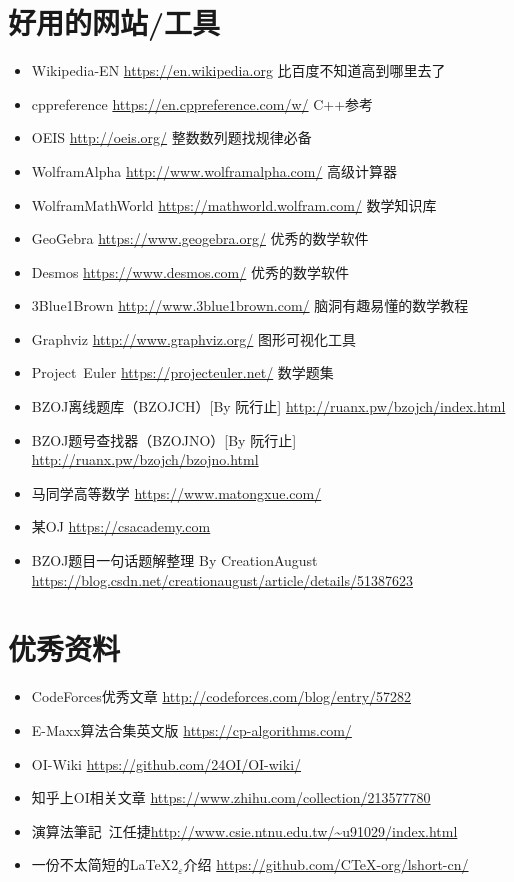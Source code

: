 \section{好用的网站/工具}
\begin{itemize}
    \item Wikipedia-EN \url{https://en.wikipedia.org} 比百度不知道高到哪里去了
    \item cppreference \url{https://en.cppreference.com/w/} C++参考
    \item OEIS \url{http://oeis.org/} 整数数列题找规律必备
    \item WolframAlpha \url{http://www.wolframalpha.com/} 高级计算器
    \item WolframMathWorld \url{https://mathworld.wolfram.com/} 数学知识库
    \item GeoGebra \url{https://www.geogebra.org/} 优秀的数学软件
    \item Desmos \url{https://www.desmos.com/} 优秀的数学软件
    \item 3Blue1Brown \url{http://www.3blue1brown.com/} 脑洞有趣易懂的数学教程
    \item Graphviz \url{http://www.graphviz.org/} 图形可视化工具
    \item Project~Euler \url{https://projecteuler.net/} 数学题集
    \item BZOJ离线题库（BZOJCH）[By 阮行止] \url{http://ruanx.pw/bzojch/index.html}
    \item BZOJ题号查找器（BZOJNO）[By 阮行止]
    \url{http://ruanx.pw/bzojch/bzojno.html}
    \item 马同学高等数学 \url{https://www.matongxue.com/}
    \item 某OJ \url{https://csacademy.com}
    \item BZOJ题目一句话题解整理 By CreationAugust\\\url{https://blog.csdn.net/creationaugust/article/details/51387623}
\end{itemize}
\section{优秀资料}
\begin{itemize}
    \item CodeForces优秀文章 \url{http://codeforces.com/blog/entry/57282}
    \item E-Maxx算法合集英文版 \url{https://cp-algorithms.com/}
    \item OI-Wiki \url{https://github.com/24OI/OI-wiki/}
    \item 知乎上OI相关文章 \url{https://www.zhihu.com/collection/213577780}
    \item 演算法筆記~江任捷\url{http://www.csie.ntnu.edu.tw/\~u91029/index.html}
    \item 一份不太简短的\LaTeX{}$2_{\varepsilon}$介绍
    \url{https://github.com/CTeX-org/lshort-cn/}
\end{itemize}
